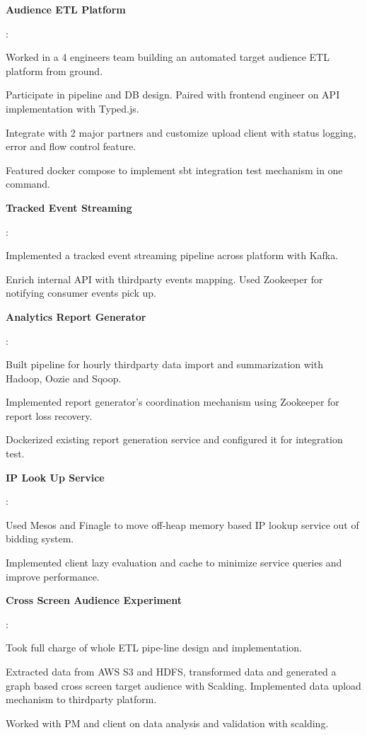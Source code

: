 \documentclass[letterpaper,11pt]{article}
\newcommand{\resumeItem}[2]{
	\item\small{
		\textbf{#1 \hspace{-2pt}}{: #2 \vspace{-2pt}}
	}
}
\begin{document}
	\resumeItem{Audience ETL Platform}{
				\begin{description}[font=$\diamond$\scshape\bfseries,leftmargin=11pt,labelindent=0pt]
					\item Worked in a 4 engineers team building an automated target audience ETL platform from ground. 
					\item Participate in pipeline and DB design. Paired with frontend engineer on API implementation with Typed.js.
					\item Integrate with 2 major partners and customize upload client with status logging, error and flow control feature. 
					\item Featured docker compose to implement sbt integration test mechanism in one command.
				\end{description}
	}
	\resumeItem{Tracked Event Streaming}{
				\begin{description}[font=$\diamond$\scshape\bfseries,leftmargin=11pt,labelindent=0pt]
					\item Implemented a tracked event streaming pipeline across platform with Kafka.	
					\item Enrich internal API with thirdparty events mapping. Used Zookeeper for notifying consumer events pick up.
				\end{description}
	}
	\resumeItem{Analytics Report Generator}{
				\begin{description}[font=$\diamond$\scshape\bfseries,leftmargin=11pt,labelindent=0pt]
					\item Built pipeline for hourly thirdparty data import and summarization  with Hadoop, Oozie and Sqoop.
					\item Implemented report generator's coordination mechanism using Zookeeper for report loss recovery.
					\item Dockerized existing report generation service and configured it for integration test.
				\end{description}
	}
	\resumeItem{IP Look Up Service}{
				\begin{description}[font=$\diamond$\scshape\bfseries,leftmargin=11pt,labelindent=0pt]
					\item Used Mesos and Finagle to move off-heap memory based IP lookup service out of bidding system.
					\item Implemented client lazy evaluation and cache to minimize service queries and improve performance.
				\end{description}
	}
	
	\resumeItem{Cross Screen Audience Experiment}{
				\begin{description}[font=$\diamond$\scshape\bfseries,leftmargin=11pt,labelindent=0pt]
					\item Took full charge of whole ETL pipe-line design and implementation. 
					\item Extracted data from AWS S3 and HDFS, transformed data and generated a graph based cross screen target audience with Scalding. Implemented data upload mechanism to thirdparty platform. 
					\item Worked with PM and client on data analysis and validation with scalding.
				\end{description}
	}
\end{document}
